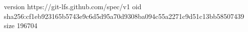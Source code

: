 version https://git-lfs.github.com/spec/v1
oid sha256:cf1eb923165b5743e9c6d5d95a70d9308ba094c55a2271c9d51c13bb58507439
size 196704
